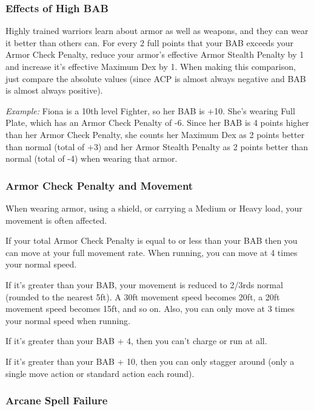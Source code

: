 \subsubsection{Effects of High BAB}

Highly trained warriors learn about armor as well as weapons, and they can wear it better than others can. For every 2 full points that your BAB exceeds your Armor Check Penalty, reduce your armor's effective Armor Stealth Penalty by 1 and increase it's effective Maximum Dex by 1. When making this comparison, just compare the absolute values (since ACP is almost always negative and BAB is almost always positive).

\textit{Example:} Fiona is a 10th level Fighter, so her BAB is +10. She's wearing Full Plate, which has an Armor Check Penalty of -6. Since her BAB is 4 points higher than her Armor Check Penalty, she counts her Maximum Dex as 2 points better than normal (total of +3) and her Armor Stealth Penalty as 2 points better than normal (total of -4) when wearing that armor.

\subsubsection{Armor Check Penalty and Movement}

When wearing armor, using a shield, or carrying a Medium or Heavy load, your movement is often affected.

\begin{itemize*}
\item If your total Armor Check Penalty is equal to or less than your BAB then you can move at your full movement rate. When running, you can move at 4 times your normal speed.
\item If it's greater than your BAB, your movement is reduced to 2/3rds normal (rounded to the nearest 5ft). A 30ft movement speed becomes 20ft, a 20ft movement speed becomes 15ft, and so on. Also, you can only move at 3 times your normal speed when running.
\item If it's greater than your BAB + 4, then you can't charge or run at all.
\item If it's greater than your BAB + 10, then you can only stagger around (only a single move action or standard action each round).
\end{itemize*}

\subsubsection{Arcane Spell Failure}

